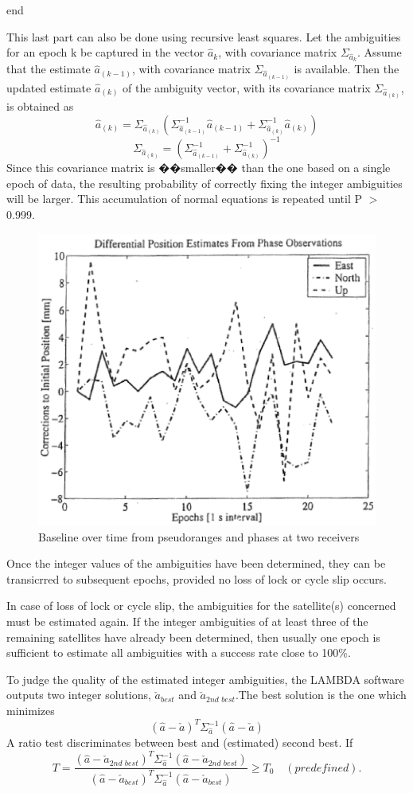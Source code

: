 end

This last part can also be done using recursive least squares. Let the ambiguities for an epoch k be captured in the vector $\hat{a}_{k}$, with covariance matrix $\Sigma_{\hat{a}_{k}}$. Assume that the estimate $\hat{a}_{(k-1)}$, with covariance matrix $\Sigma_{\hat{a}_{(k-1)}}$ is available. Then the updated estimate $\hat{a}_{(k)}$ of the ambiguity vector, with its covariance matrix  $\Sigma_{\hat{a}_{(k)}}$, is obtained as
$$
\hat{a}_{(k)}=\Sigma_{\hat{a}_{(k)}}(\Sigma_{\hat{a}_{(k-1)}}^{-1}\hat{a}_{(k-1)}+\Sigma_{\hat{a}_{(k)}}^{-1}\hat{a}_{(k)})
$$
$$
\Sigma_{\hat{a}_{(k)}}=(\Sigma_{\hat{a}_{(k-1)}}^{-1}+\Sigma_{\hat{a}_{(k)}}^{-1})^{-1}
$$
Since this covariance matrix is ��smaller�� than the one based on a single epoch of data,
the resulting probability of correctly fixing the integer ambiguities will be larger. This
accumulation of normal equations is repeated until P $>$ 0.999.

\begin{figure}
	\centering
	\includegraphics[width=0.4\linewidth]{TeX_files/Part03/chapter10/image/9-8}
	\caption{Baseline over time from pseudoranges and phases at two receivers}
	\label{fig:9-8}
\end{figure}

Once the integer values of the ambiguities have been determined, they can be transicrred to subsequent epochs, provided no loss of lock or cycle slip occurs.

In case of loss of lock or cycle slip, the ambiguities for the satellite(s) concerned must be estimated again. If the integer ambiguities of at least three of the remaining satellites have already been determined, then usually one epoch is sufficient to estimate all ambiguities with a success rate close to 100\%.

To judge the quality of the estimated integer ambiguities, the LAMBDA software outputs
two integer solutions, $\check{a}_{best}$ and $\check{a}_{2nd\,\,best}$.The best solution is the one which minimizes
$$
(\hat{a}-\check{a})^{T}\Sigma_{\hat{a}}^{-1}(\hat{a}-\check{a})
$$
A ratio test discriminates between best and (estimated) second best. If
\begin{equation}
T=\frac{(\hat{a}-\check{a}_{2nd\,\,best})^{T}\Sigma_{\hat{a}}^{-1}(\hat{a}-\check{a}_{2nd\,\,best})}{(\hat{a}-\check{a}_{best})^{T}\Sigma_{\hat{a}}^{-1}(\hat{a}-\check{a}_{best})}\geq T_{0}\,\,\,\,\,\,(predefined).
\end{equation}

